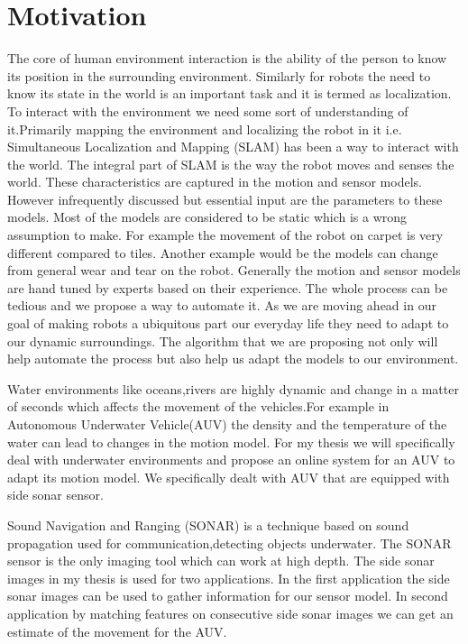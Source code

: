\documentclass[12pt]{dalcsthesis}
\begin{document}
\section{Motivation}
The core of human environment interaction is the ability of the person to know its position in the surrounding environment. Similarly for robots the need to know its state in the world is an important task and it is termed as localization. To interact with the environment we need some sort of understanding of it.Primarily mapping the environment and localizing the robot in it i.e. Simultaneous Localization and Mapping (SLAM) has been a way to interact with the world. The integral part of SLAM is the way the robot moves and senses the world. These characteristics are captured in the motion and sensor models. However infrequently discussed but essential input are the parameters to these models. Most of the models are considered to be static which is a wrong assumption to make. For example the movement of the robot on carpet is very different compared to tiles. Another example would be the models can change from general wear and tear on the robot. Generally the motion and sensor models are hand tuned by experts based on their experience. The whole process can be tedious and we propose a way to automate it. As we are moving ahead in our goal of making robots a ubiquitous part our everyday life they need to adapt to our dynamic surroundings. The algorithm that we are proposing not only will help automate the process but also help us adapt the models to our environment.

Water environments like oceans,rivers are highly dynamic and change in a matter of seconds which affects the movement of the vehicles.For example in Autonomous Underwater Vehicle(AUV) the density and the temperature of the water can lead to changes in the motion model. For my thesis we will specifically deal with underwater environments and propose an online system for an AUV to adapt its motion model. We specifically dealt with AUV that are equipped with side sonar sensor. 

Sound Navigation and Ranging (SONAR) is a technique based on sound propagation used for communication,detecting objects underwater. The SONAR sensor is the only imaging tool which can work at high depth. The side sonar images in my thesis is used for two applications. In the first application the side sonar images can be used to gather information for our sensor model. In second application by matching features on consecutive side sonar images we can get an estimate of the movement for the AUV. 
\end{document}
